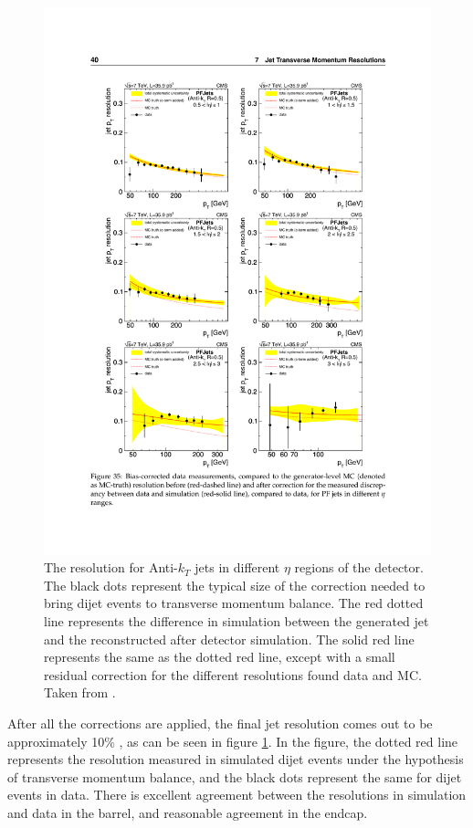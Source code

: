     \begin{figure}[!h]
      \centering
      \includegraphics[width=.8\textwidth]{figures/jet_resolution.pdf}
      \caption{The \pt resolution for Anti-$k_T$ jets in different $\eta$ regions of the detector. The black dots represent the typical size of the correction needed to bring dijet events to transverse momentum balance. The red dotted line represents the difference in simulation between the generated jet \pt and the \pt reconstructed after detector simulation. The solid red line represents the same as the dotted red line, except with a small residual correction for the different resolutions found data and MC. Taken from \cite{jetmet_2011}.}
      \label{fig:jet_resolution}
    \end{figure}

    After all the corrections are applied, the final jet \pt resolution comes out to be approximately 10\% \cite[sec 7.2]{jetmet_2011}, as can be seen in figure \ref{fig:jet_resolution}. In the figure, the dotted red line represents the \pt resolution measured in simulated dijet events under the hypothesis of transverse momentum balance, and the black dots represent the same for dijet events in data. There is excellent agreement between the resolutions in simulation and data in the barrel, and reasonable agreement in the endcap.

